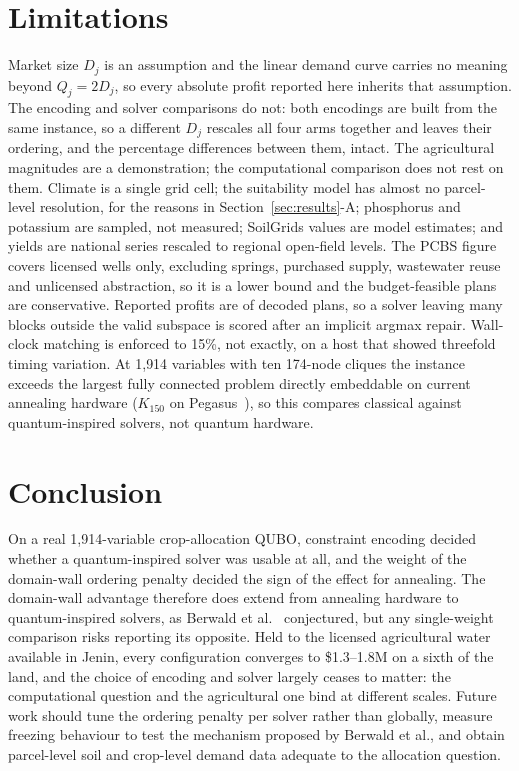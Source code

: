 \documentclass[conference,a4paper]{IEEEtran}
\begin{document}
\section{Limitations}
\label{sec:limits}

Market size $D_j$ is an assumption and the linear demand curve carries no
meaning beyond $Q_j=2D_j$, so every absolute profit reported here inherits that
assumption. The encoding and solver comparisons do not: both encodings are
built from the same instance, so a different $D_j$ rescales all four arms
together and leaves their ordering, and the percentage differences between
them, intact. The agricultural magnitudes are a demonstration; the
computational comparison does not rest on them. Climate is a single grid cell; the suitability
model has almost no parcel-level resolution, for the reasons in
Section~\ref{sec:results}-A; phosphorus and potassium are sampled, not
measured; SoilGrids values are model estimates; and yields are national
series rescaled to regional open-field levels. The PCBS figure covers
licensed wells only, excluding springs, purchased supply, wastewater reuse
and unlicensed abstraction, so it is a lower bound and the budget-feasible
plans are conservative. Reported profits are of decoded plans, so a solver
leaving many blocks outside the valid subspace is scored after an implicit
argmax repair. Wall-clock matching is enforced to 15\%, not exactly, on a
host that showed threefold timing variation. At 1{,}914 variables with ten
174-node cliques the instance exceeds the largest fully connected problem
directly embeddable on current annealing hardware ($K_{150}$ on
Pegasus~\cite{dwaveembed}), so this compares classical against
quantum-inspired solvers, not quantum hardware.

\section{Conclusion}
\label{sec:concl}

On a real 1{,}914-variable crop-allocation QUBO, constraint encoding decided
whether a quantum-inspired solver was usable at all, and the weight of the
domain-wall ordering penalty decided the sign of the effect for annealing.
The domain-wall advantage therefore does extend from annealing hardware to
quantum-inspired solvers, as Berwald et al.~\cite{berwald2022} conjectured,
but any single-weight comparison risks reporting its opposite. Held to the
licensed agricultural water available in Jenin, every configuration converges
to \$1.3--1.8M on a sixth of the land, and the choice of encoding and solver
largely ceases to matter: the computational question and the agricultural one
bind at different scales. Future work should tune the ordering penalty per
solver rather than globally, measure freezing behaviour to test the mechanism
proposed by Berwald et al., and obtain parcel-level soil and crop-level demand
data adequate to the allocation question.

{\footnotesize


}
\end{document}
